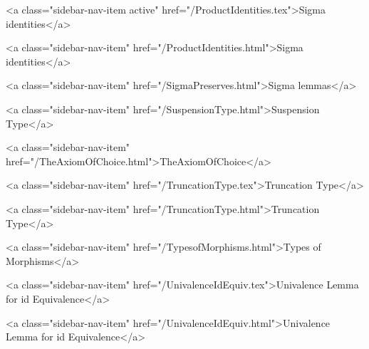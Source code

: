       
    
      
        
          <a class="sidebar-nav-item active" href="/ProductIdentities.tex">Sigma identities</a>
        
      
    
      
        
          <a class="sidebar-nav-item" href="/ProductIdentities.html">Sigma identities</a>
        
      
    
      
        
          <a class="sidebar-nav-item" href="/SigmaPreserves.html">Sigma lemmas</a>
        
      
    
      
        
          <a class="sidebar-nav-item" href="/SuspensionType.html">Suspension Type</a>
        
      
    
      
        
          <a class="sidebar-nav-item" href="/TheAxiomOfChoice.html">TheAxiomOfChoice</a>
        
      
    
      
        
          <a class="sidebar-nav-item" href="/TruncationType.tex">Truncation Type</a>
        
      
    
      
        
          <a class="sidebar-nav-item" href="/TruncationType.html">Truncation Type</a>
        
      
    
      
        
          <a class="sidebar-nav-item" href="/TypesofMorphisms.html">Types of Morphisms</a>
        
      
    
      
        
          <a class="sidebar-nav-item" href="/UnivalenceIdEquiv.tex">Univalence Lemma for id Equivalence</a>
        
      
    
      
        
          <a class="sidebar-nav-item" href="/UnivalenceIdEquiv.html">Univalence Lemma for id Equivalence</a>
        
      
    
      
        
